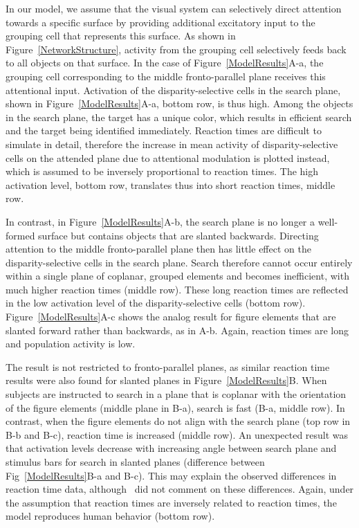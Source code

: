 In our model, we assume that the visual system can selectively direct attention towards a specific surface by providing additional excitatory input to the grouping cell that represents this surface. As shown in Figure~\ref{NetworkStructure}, activity from the grouping cell selectively feeds back to all objects on that surface. In the case of Figure~\ref{ModelResults}A-a, the grouping cell corresponding to the middle fronto-parallel plane receives this attentional input. Activation of the disparity-selective cells in the search plane, shown in Figure~\ref{ModelResults}A-a, bottom row, is thus high. Among the objects in the search plane, the target has a unique color, which results in efficient search and the target being identified immediately. Reaction times are difficult to simulate in detail, therefore the increase in mean activity of disparity-selective cells on the attended plane due to attentional modulation is plotted instead, which is assumed to be inversely proportional to reaction times. The
high activation level, bottom row, translates thus into short reaction times, middle row.

In contrast, in Figure~\ref{ModelResults}A-b, the search plane is no longer a well-formed surface but contains objects that are slanted backwards. Directing attention to the middle fronto-parallel plane then has little effect on the disparity-selective cells in the search plane. Search therefore cannot occur entirely within a single plane of coplanar, grouped elements and becomes inefficient, with much higher reaction times (middle row). These long reaction times are reflected in the low activation level of the disparity-selective cells (bottom row). Figure~\ref{ModelResults}A-c shows the analog result for figure elements that are slanted forward rather than backwards, as in A-b. Again, reaction times are long and population activity is low. 

The result is not restricted to fronto-parallel planes, as similar reaction time results were also found for slanted planes in Figure~\ref{ModelResults}B. When subjects are instructed to search in a plane that is coplanar with the orientation of the figure elements (middle plane in B-a), search is fast (B-a, middle row). In contrast,
when the figure elements do not align with the search plane (top row in B-b and B-c), reaction time is increased (middle row). An unexpected result was that activation levels decrease with increasing angle between search plane and stimulus bars for search in slanted planes (difference between Fig~\ref{ModelResults}B-a and B-c). This may explain the observed differences in reaction time data, although~\citet{He_Nakayama95} did not comment on these differences. Again, under the assumption that reaction times are inversely related to reaction times, the model reproduces human behavior (bottom row).

